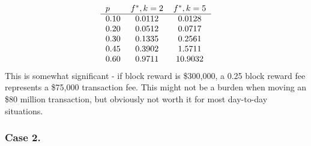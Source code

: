 \documentclass{article}%
\begin{document}
\[ \begin{tabular}[c]{lcc} $p$ & $f^{\ast},k=2$ & $f^{\ast},k=5$\\ \hline $0.10$ & $0.0112$ & $0.0128$\\ $0.20$ & $0.0512$ & $0.0717$\\ $0.30$ & $0.1335$ & $0.2561$\\ $0.45$ & $0.3902$ & $1.5711$\\ $0.60$ & $0.9711$ & $10.9032$\\ \end{tabular} \]
This is somewhat significant - if block reward is \$300,000, a 0.25 block reward fee
represents a \$75,000 transaction fee.  This might not be a burden when
moving an \$80 million transaction, but obviously not worth it for most
day-to-day situations.

\subsubsection{Case 2.  }
\end{document}
